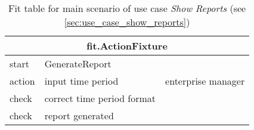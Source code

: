 
\begin{table}
\begin{centering}
\begin{tabular}{|l|l|l|}

\hline  \multicolumn{3}{|c|}{fit.ActionFixture} \\
\hline start & GenerateReport &  \\ 
\hline action & input time period & enterprise manager \\ 
\hline check & correct time period format &  \\ 
\hline check & report generated &  \\ 
\hline 
\end{tabular}

\caption{Fit table for main scenario of use case \emph{Show Reports} (see \autoref{sec:use_case_show_reports})}
 
\par\end{centering}
\end{table}